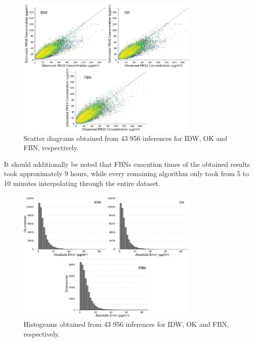 \begin{figure}[ht]
\centering
\includegraphics[width=0.8\textwidth]{./Images/Results/performance-scatter-diagrams.jpg}
\caption{Scatter diagrams obtained from 43 956 inferences for IDW, OK and FBN, respectively.}
\label{fig:performance-scatter-diagrams}
\end{figure}

It should additionally be noted that FBNs execution times of the obtained results took approximately 9 hours, while every remaining algorithm only took from 5 to 10 minutes interpolating through the entire dataset.



\begin{figure}[ht]
\centering
\includegraphics[width=0.8\textwidth]{./Images/Results/performance-histograms.jpg}
\caption{Histograms obtained from 43 956 inferences for IDW, OK and FBN, respectively.}
\label{fig:performance-histograms}
\end{figure}

